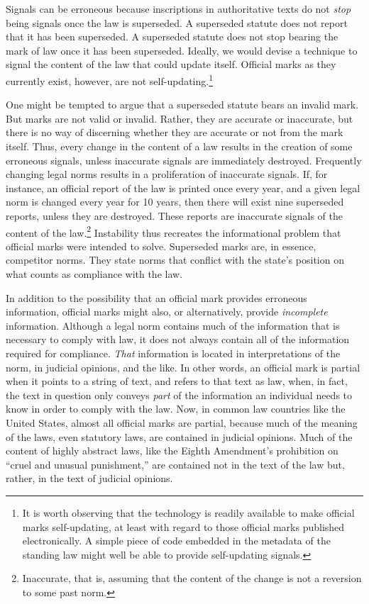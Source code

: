 Signals can be erroneous because inscriptions in authoritative texts do
not \emph{stop} being signals once the law is superseded. A superseded
statute does not report that it has been superseded. A superseded
statute does not stop bearing the mark of law once it has been
superseded. Ideally, we would devise a technique to signal the content
of the law that could update itself. Official marks as they currently
exist, however, are not self-updating.\footnote{It is worth observing
  that the technology is readily available to make official marks
  self-updating, at least with regard to those official marks published
  electronically. A simple piece of code embedded in the metadata of the
  standing law might well be able to provide self-updating signals.}

One might be tempted to argue that a superseded statute bears an invalid
mark. But marks are not valid or invalid. Rather, they are accurate or
inaccurate, but there is no way of discerning whether they are accurate
or not from the mark itself. Thus, every change in the content of a law
results in the creation of some erroneous signals, unless inaccurate
signals are immediately destroyed. Frequently changing legal norms
results in a proliferation of inaccurate signals. If, for instance, an
official report of the law is printed once every year, and a given legal
norm is changed every year for 10 years, then there will exist nine
superseded reports, unless they are destroyed. These reports are
inaccurate signals of the content of the law.\footnote{Inaccurate, that
  is, assuming that the content of the change is not a reversion to some
  past norm.} Instability thus recreates the informational problem that
official marks were intended to solve. Superseded marks are, in essence,
competitor norms. They state norms that conflict with the state's
position on what counts as compliance with the law.

In addition to the possibility that an official mark provides erroneous
information, official marks might also, or alternatively, provide
\emph{incomplete} information. Although a legal norm contains much of
the information that is necessary to comply with law, it does not always
contain all of the information required for compliance. \emph{That}
information is located in interpretations of the norm, in judicial
opinions, and the like. In other words, an official mark is partial when
it points to a string of text, and refers to that text as law, when, in
fact, the text in question only conveys \emph{part} of the information
an individual needs to know in order to comply with the law. Now, in
common law countries like the United States, almost all official marks
are partial, because much of the meaning of the laws, even statutory
laws, are contained in judicial opinions. Much of the content of highly
abstract laws, like the Eighth Amendment's prohibition on ``cruel and
unusual punishment,'' are contained not in the text of the law but,
rather, in the text of judicial opinions.

